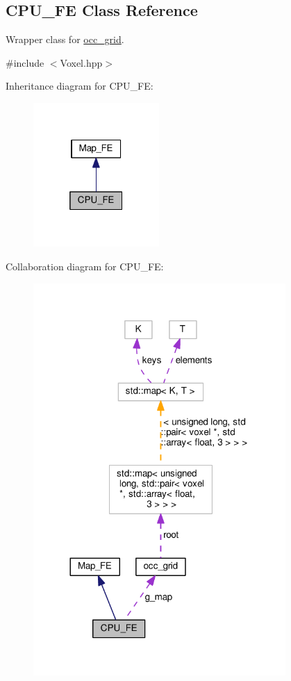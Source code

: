 \hypertarget{classCPU__FE}{}\subsection{C\+P\+U\+\_\+\+FE Class Reference}
\label{classCPU__FE}


Wrapper class for \hyperlink{classocc__grid}{occ\+\_\+grid}.  




{\ttfamily \#include $<$Voxel.\+hpp$>$}



Inheritance diagram for C\+P\+U\+\_\+\+FE\+:\nopagebreak
\begin{figure}[H]
\begin{center}
\leavevmode
\includegraphics[width=136pt]{classCPU__FE__inherit__graph}
\end{center}
\end{figure}


Collaboration diagram for C\+P\+U\+\_\+\+FE\+:\nopagebreak
\begin{figure}[H]
\begin{center}
\leavevmode
\includegraphics[width=272pt]{classCPU__FE__coll__graph}
\end{center}
\end{figure}
